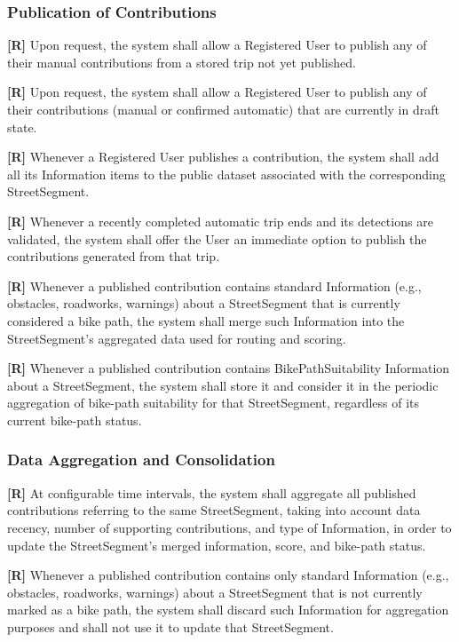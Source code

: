 \subsubsection*{Publication of Contributions}

\item \textbf{[R\creq]} Upon request, the system shall allow a Registered User to publish any of their manual contributions from a stored trip not yet published.

\textbf{[R\creq]} Upon request, the system shall allow a Registered User to publish any of their contributions (manual or confirmed automatic) that are currently in draft state.

\textbf{[R\creq]} Whenever a Registered User publishes a contribution, the system shall add all its Information items to the public dataset associated with the corresponding StreetSegment.

\textbf{[R\creq]} Whenever a recently completed automatic trip ends and its detections are validated, the system shall offer the User an immediate option to publish the contributions generated from that trip.

\textbf{[R\creq]} Whenever a published contribution contains standard Information (e.g., obstacles, roadworks, warnings) about a StreetSegment that is currently considered a bike path, the system shall merge such Information into the StreetSegment’s aggregated data used for routing and scoring.

\textbf{[R\creq]} Whenever a published contribution contains BikePathSuitability Information about a StreetSegment, the system shall store it and consider it in the periodic aggregation of bike-path suitability for that StreetSegment, regardless of its current bike-path status.





\subsubsection*{Data Aggregation and Consolidation}
\textbf{[R\creq]} At configurable time intervals, the system shall aggregate all published contributions referring to the same StreetSegment, taking into account data recency, number of supporting contributions, and type of Information, in order to update the StreetSegment’s merged information, score, and bike-path status.



\textbf{[R\creq]} Whenever a published contribution contains only standard Information 
(e.g., obstacles, roadworks, warnings) about a StreetSegment that is not currently marked 
as a bike path, the system shall discard such Information for aggregation purposes and 
shall not use it to update that StreetSegment.

